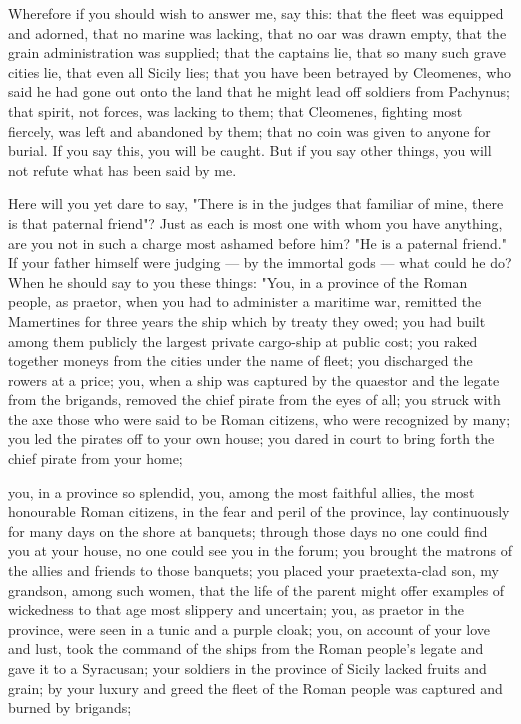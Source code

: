  Wherefore if you should wish to answer me, say this: that the fleet was equipped and adorned, that no marine was lacking, that no oar was drawn empty, that the grain administration was supplied; that the captains lie, that so many such grave cities lie, that even all Sicily lies; that you have been betrayed by Cleomenes, who said he had gone out onto the land that he might lead off soldiers from Pachynus; that spirit, not forces, was lacking to them; that Cleomenes, fighting most fiercely, was left and abandoned by them; that no coin was given to anyone for burial. If you say this, you will be caught. But if you say other things, you will not refute what has been said by me.

 Here will you yet dare to say, "There is in the judges that familiar of mine, there is that paternal friend"? Just as each is most one with whom you have anything, are you not in such a charge most ashamed before him? "He is a paternal friend." If your father himself were judging --- by the immortal gods --- what could he do? When he should say to you these things: "You, in a province of the Roman people, as praetor, when you had to administer a maritime war, remitted the Mamertines for three years the ship which by treaty they owed; you had built among them publicly the largest private cargo-ship at public cost; you raked together moneys from the cities under the name of fleet; you discharged the rowers at a price; you, when a ship was captured by the quaestor and the legate from the brigands, removed the chief pirate from the eyes of all; you struck with the axe those who were said to be Roman citizens, who were recognized by many; you led the pirates off to your own house; you dared in court to bring forth the chief pirate from your home;

 you, in a province so splendid, you, among the most faithful allies, the most honourable Roman citizens, in the fear and peril of the province, lay continuously for many days on the shore at banquets; through those days no one could find you at your house, no one could see you in the forum; you brought the matrons of the allies and friends to those banquets; you placed your praetexta-clad son, my grandson, among such women, that the life of the parent might offer examples of wickedness to that age most slippery and uncertain; you, as praetor in the province, were seen in a tunic and a purple cloak; you, on account of your love and lust, took the command of the ships from the Roman people's legate and gave it to a Syracusan; your soldiers in the province of Sicily lacked fruits and grain; by your luxury and greed the fleet of the Roman people was captured and burned by brigands;

